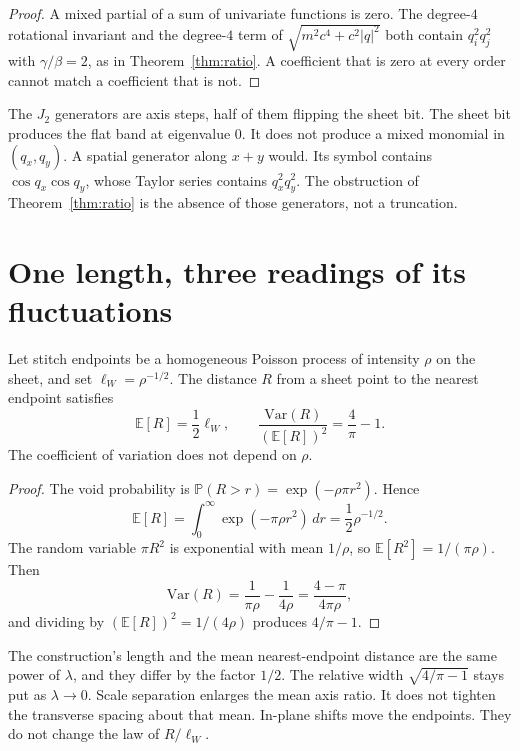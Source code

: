 \begin{proof}
A mixed partial of a sum of univariate functions is zero.
The degree-\(4\) rotational invariant and the degree-\(4\) term of
\(\sqrt{m^2c^4+c^2|q|^2}\) both contain \(q_i^2 q_j^2\) with
\(\gamma/\beta=2\), as in Theorem~\ref{thm:ratio}.
A coefficient that is zero at every order cannot match a coefficient
that is not.
\end{proof}

The \(J_2\) generators are axis steps, half of them flipping the sheet bit.
The sheet bit produces the flat band at eigenvalue \(0\).
It does not produce a mixed monomial in \((q_x,q_y)\).
A spatial generator along \(x+y\) would.
Its symbol contains \(\cos q_x\cos q_y\), whose Taylor series contains
\(q_x^2 q_y^2\).
The obstruction of Theorem~\ref{thm:ratio} is the absence of those
generators, not a truncation.

\section{One length, three readings of its fluctuations}
\label{sec:moments}

\begin{proposition}
\label{prop:rayleigh}
Let stitch endpoints be a homogeneous Poisson process of intensity
\(\rho\) on the sheet, and set \(\ell_W=\rho^{-1/2}\).
The distance \(R\) from a sheet point to the nearest endpoint satisfies
\[
\mathbb{E}[R]=\frac12\ell_W,\qquad
\frac{\mathrm{Var}(R)}{(\mathbb{E}[R])^2}=\frac4\pi-1.
\]
The coefficient of variation does not depend on \(\rho\).
\end{proposition}

\begin{proof}
The void probability is \(\mathbb{P}(R>r)=\exp(-\rho\pi r^2)\).
Hence
\[
\mathbb{E}[R]
=\int_0^\infty\exp(-\pi\rho r^2)\,dr
=\frac12\rho^{-1/2}.
\]
The random variable \(\pi R^2\) is exponential with mean \(1/\rho\), so
\(\mathbb{E}[R^2]=1/(\pi\rho)\).
Then
\[
\mathrm{Var}(R)
=\frac1{\pi\rho}-\frac1{4\rho}
=\frac{4-\pi}{4\pi\rho},
\]
and dividing by \((\mathbb{E}[R])^2=1/(4\rho)\) produces \(4/\pi-1\).
\end{proof}

The construction's length and the mean nearest-endpoint distance are the
same power of \(\lambda\), and they differ by the factor \(1/2\).
The relative width \(\sqrt{4/\pi-1}\) stays put as \(\lambda\to 0\).
Scale separation enlarges the mean axis ratio.
It does not tighten the transverse spacing about that mean.
In-plane shifts move the endpoints.
They do not change the law of \(R/\ell_W\).

